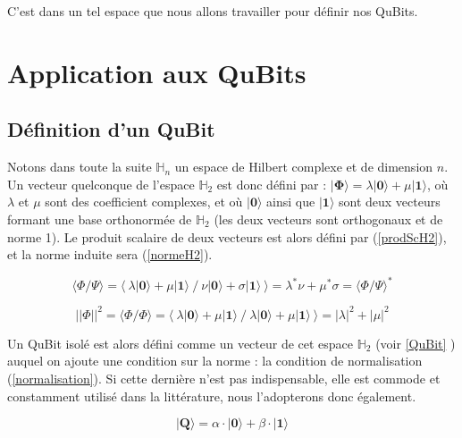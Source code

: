\documentclass[a4paper,12pt]{report}
\newcommand{\prodSc}[2]{\langle #1 / #2 \rangle}
\newcommand{\quSt}[1]{\bm{|#1\rangle}}
\newcommand{\icite}[1]{\up{\textit{\cite{#1}}}}
\begin{document}
\vspace{1\baselineskip}

\par{
	C'est dans un tel espace que nous allons travailler pour définir nos QuBits.
}

	\section{Application aux QuBits}

		\subsection{Définition d'un QuBit}

\par{
	Notons dans toute la suite $\mathbb{H}_{n}$ un espace de Hilbert complexe et de dimension $n$. Un vecteur quelconque de l'espace $\mathbb{H}_{2}$ est donc défini par : $\quSt{\Phi} = \lambda \quSt{0} + \mu \quSt{1}$, où $\lambda$ et $\mu$ sont des coefficient complexes, et où $\quSt{0}$ ainsi que $\quSt{1} $ sont deux vecteurs formant une base orthonormée de $\mathbb{H}_{2}$ (les deux vecteurs sont orthogonaux et de norme 1). Le produit scalaire de deux vecteurs est alors défini par (\ref{prodScH2}), et la norme induite sera (\ref{normeH2}).
}

\begin{equation} \label{prodScH2}
	 \prodSc{\Phi}{\Psi} = \langle ~ \lambda \quSt{0} + \mu \quSt{1} ~/~ \nu \quSt{0} + \sigma \quSt{1} ~\rangle = \lambda^* \nu + \mu^* \sigma = \prodSc{\Phi}{\Psi}^*
\end{equation}

\begin{equation} \label{normeH2}
	 || \Phi ||^2 = \prodSc{\Phi}{\Phi} = \langle ~ \lambda \quSt{0} + \mu \quSt{1} ~/~ \lambda \quSt{0} + \mu \quSt{1} ~\rangle = |\lambda|^2 + |\mu|^2
\end{equation}

\vspace{1\baselineskip}

\par{
	Un QuBit\icite{ref2} isolé est alors défini comme un vecteur de cet espace $\mathbb{H}_{2}$ (voir \ref{QuBit} ) auquel on ajoute une condition sur la norme : la condition de normalisation (\ref{normalisation}). Si cette dernière n'est pas indispensable, elle est commode et constamment utilisé dans la littérature, nous l'adopterons donc également.
}

\begin{equation} \label{QuBit}
	\quSt{Q} = \alpha \cdot \quSt{0} + \beta \cdot \quSt{1}
\end{equation}
\end{document}
